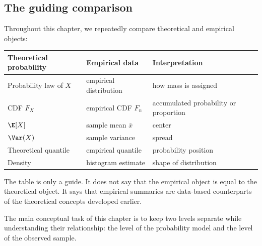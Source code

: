 \subsection*{The guiding comparison}

Throughout this chapter, we repeatedly compare theoretical and empirical objects:
\begin{center}
\begin{tabular}{lll}
\toprule
Theoretical probability & Empirical data & Interpretation \\
\midrule
Probability law of \(X\) & empirical distribution & how mass is assigned \\
CDF \(F_X\) & empirical CDF \(F_n\) & accumulated probability or proportion \\
\(\E[X]\) & sample mean \(\bar{x}\) & center \\
\(\Var(X)\) & sample variance & spread \\
Theoretical quantile & empirical quantile & probability position \\
Density & histogram estimate & shape of distribution \\
\bottomrule
\end{tabular}
\end{center}

The table is only a guide. It does not say that the empirical object is equal to
the theoretical object. It says that empirical summaries are data-based
counterparts of the theoretical concepts developed earlier.

\begin{theorembox}
The main conceptual task of this chapter is to keep two levels separate while
understanding their relationship: the level of the probability model and the
level of the observed sample.
\end{theorembox}
